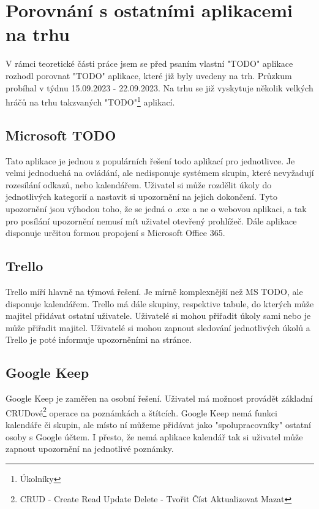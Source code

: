 \chapter{Porovnání s ostatními aplikacemi na trhu}
V rámci teoretické části práce jsem se před psaním vlastní "TODO" aplikace rozhodl porovnat "TODO" aplikace, které již byly uvedeny na trh. Průzkum probíhal v týdnu 15.09.2023 - 22.09.2023.
Na trhu se již vyskytuje několik velkých hráčů na trhu takzvaných "TODO"\footnote{Úkolníky} aplikací.
\section{Microsoft TODO}
Tato aplikace je jednou z populárních řešení todo aplikací pro jednotlivce. Je velmi jednoduchá na ovládání, ale nedisponuje systémem skupin, které nevyžadují rozesílání odkazů, nebo kalendářem. Uživatel si může rozdělit úkoly do jednotlivých kategorií a nastavit si upozornění na jejich dokončení. Tyto upozornění jsou výhodou toho, že se jedná o .exe a ne o webovou aplikaci, a tak pro posílání upozornění nemusí mít uživatel otevřený prohlížeč. Dále aplikace disponuje určitou formou propojení s Microsoft Office 365.
\section{Trello}
Trello míří hlavně na týmová řešení. Je mírně komplexnější než MS TODO, ale disponuje kalendářem. Trello má dále skupiny, respektive tabule, do kterých může majitel přidávat ostatní uživatele. Uživatelé si mohou přiřadit úkoly sami nebo je může přiřadit majitel. Uživatelé si mohou zapnout sledování jednotlivých úkolů a Trello je poté informuje upozorněními na stránce.
\section{Google Keep}
Google Keep je zaměřen na osobní řešení. Uživatel má možnost provádět základní CRUDové\footnote{CRUD - Create Read Update Delete - Tvořit Číst Aktualizovat Mazat} operace na poznámkách a štítcích. Google Keep nemá funkci kalendáře či skupin, ale místo ní můžeme přidávat jako "spolupracovníky" ostatní osoby s Google účtem. I přesto, že nemá aplikace kalendář tak si uživatel může zapnout upozornění na jednotlivé poznámky.
